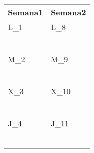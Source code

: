\clearpage
{}


	\renewcommand{\arraystretch}{1.25}\scriptsize
	\begin{longtabu} to \textwidth { X[l] X[l]}
		\centering \textbf{Semana1} &  \centering\textbf{Semana2}  \\
		\toprule
		L_{1} & L_{8} \\
		\makebox{$\square$}\dotfill & \makebox{$\square$}\dotfill \\
		\dotfill & \dotfill \\
		\makebox{$\square$}\dotfill & \makebox{$\square$}\dotfill \\
		\dotfill & \dotfill \\
		\makebox{$\square$}\dotfill & \makebox{$\square$}\dotfill \\
		\dotfill & \dotfill \\

		\hline

		M_{2} & M_{9} \\
		\makebox{$\square$}\dotfill & \makebox{$\square$}\dotfill \\
		\dotfill & \dotfill \\
		\makebox{$\square$}\dotfill & \makebox{$\square$}\dotfill \\
		\dotfill & \dotfill \\
		\makebox{$\square$}\dotfill & \makebox{$\square$}\dotfill \\
		\dotfill & \dotfill \\

		\hline

		X_{3} & X_{10} \\
		\makebox{$\square$}\dotfill & \makebox{$\square$}\dotfill \\
		\dotfill & \dotfill \\
		\makebox{$\square$}\dotfill & \makebox{$\square$}\dotfill \\
		\dotfill & \dotfill \\
		\makebox{$\square$}\dotfill & \makebox{$\square$}\dotfill \\
		\dotfill & \dotfill \\

		\hline

		J_{4} & J_{11} \\
		\makebox{$\square$}\dotfill & \makebox{$\square$}\dotfill \\
		\dotfill & \dotfill \\
		\makebox{$\square$}\dotfill & \makebox{$\square$}\dotfill \\
		\dotfill & \dotfill \\
		\makebox{$\square$}\dotfill & \makebox{$\square$}\dotfill \\
		\dotfill & \dotfill \\


\end{longtabu}
